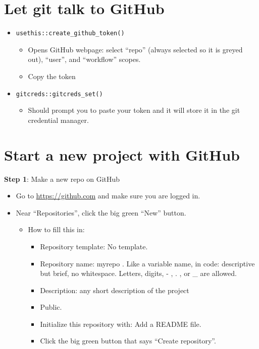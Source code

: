 \documentclass[
  letterpaper,
  DIV=11,
  numbers=noendperiod]{scrreprt}
\providecommand{\tightlist}{%
  \setlength{\itemsep}{0pt}\setlength{\parskip}{0pt}}\usepackage{longtable,booktabs,array}
\begin{document}
\hypertarget{let-git-talk-to-github}{%
\section{Let git talk to GitHub}\label{let-git-talk-to-github}}

\begin{itemize}
\tightlist
\item
  \texttt{usethis::create\_github\_token()}

  \begin{itemize}
  \tightlist
  \item
    Opens GitHub webpage: select ``repo'' (always selected so it is
    greyed out), ``user'', and ``workflow'' scopes.
  \item
    Copy the token
  \end{itemize}
\item
  \texttt{gitcreds::gitcreds\_set()}

  \begin{itemize}
  \tightlist
  \item
    Should prompt you to paste your token and it will store it in the
    git credential manager.
  \end{itemize}
\end{itemize}

\hypertarget{start-a-new-project-with-github}{%
\section{Start a new project with
GitHub}\label{start-a-new-project-with-github}}

\textbf{Step 1}: Make a new repo on GitHub

\begin{itemize}
\item
  Go to \url{https://github.com} and make sure you are logged in.
\item
  Near ``Repositories'', click the big green ``New'' button.

  \begin{itemize}
  \tightlist
  \item
    How to fill this in:

    \begin{itemize}
    \tightlist
    \item
      Repository template: No template.
    \item
      Repository name: myrepo . Like a variable name, in code:
      descriptive but brief, no whitespace. Letters, digits, - , . , or
      \_ are allowed.
    \item
      Description: any short description of the project
    \item
      Public.
    \item
      Initialize this repository with: Add a README file.
    \item
      Click the big green button that says ``Create repository''.
    \end{itemize}
  \end{itemize}
\end{itemize}
\end{document}
